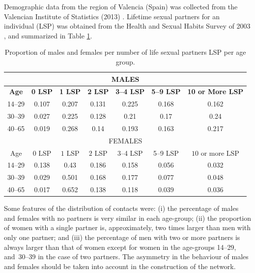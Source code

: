 Demographic data from the region of Valencia (Spain) was collected from the Valencian Institute of Statistics (2013)  \cite{IVE}.
Lifetime sexual partners for an individual (LSP) was obtained from the Health and Sexual Habits Survey of 2003 \cite{INE}, and 
summarized in Table \ref{table1}. 

\begin{table}[H]
	\centering
	\begin{tabular}{ccccccc}
		\toprule
		\multicolumn{7}{c}{\textbf{MALES}} \\ \midrule
		\textbf{ Age} & \textbf{0 LSP} & \textbf{1 LSP} &\textbf{ 2 LSP} & \textbf{3--4 LSP} & \textbf{5--9 LSP} & \textbf{10 or More LSP} \\
		\midrule
		14--29 & 0.107 & 0.207 & 0.131 & 0.225 & 0.168 & 0.162 \\
		30--39 & 0.027 & 0.225 & 0.128 & 0.21 & 0.17 & 0.24 \\
		40--65 & 0.019 & 0.268 & 0.14 & 0.193 & 0.163 & 0.217 \\
		\midrule 
		
		\multicolumn{7}{c}{FEMALES} \\ \midrule
		Age & $0$ LSP & $1$ LSP & $2$ LSP & 3--4 LSP & 5--9 LSP & $10$ or more LSP \\
		\midrule
		14--29 & 0.138 & 0.43 & 0.186 & 0.158 & 0.056 & 0.032 \\
		30--39 & 0.029 & 0.501 & 0.168 & 0.177 & 0.077 & 0.048 \\
		40--65 & 0.017 & 0.652 & 0.138 & 0.118 & 0.039 & 0.036 \\
		\bottomrule
	\end{tabular} 
	\caption{Proportion of males and females per number of life sexual partners LSP per age group.}
	\label{table1} 
\end{table}

Some features of the distribution of contacts were: (i) the percentage of males and females with no partners is
very similar in each age-group; (ii) the proportion of women  with a single partner is, approximately, two times larger than men with only one partner; and (iii) the percentage of men with two or more partners is always larger than that of women except for women in the age-groups 14--29, and~30--39 in the case of two partners. The asymmetry in the behaviour of males and females should be taken into account in the construction of the network.

